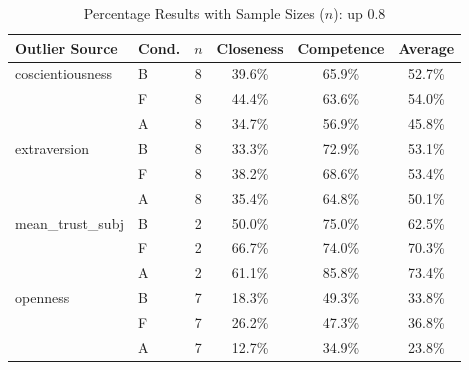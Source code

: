 \begin{table}[ht]
    \centering
    \caption{Percentage Results with Sample Sizes ($n$): up 0.8}
    \begin{tabular}{l l c c c c}
        \toprule
        \textbf{Outlier Source} & \textbf{Cond.} & \textbf{$n$} & \textbf{Closeness} & \textbf{Competence} & \textbf{Average} \\
        \midrule
        coscientiousness & B & 8 & 39.6\% & 65.9\% & 52.7\% \\
         & F & 8 & 44.4\% & 63.6\% & 54.0\% \\
         & A & 8 & 34.7\% & 56.9\% & 45.8\% \\
        \addlinespace
        extraversion & B & 8 & 33.3\% & 72.9\% & 53.1\% \\
         & F & 8 & 38.2\% & 68.6\% & 53.4\% \\
         & A & 8 & 35.4\% & 64.8\% & 50.1\% \\
        \addlinespace
        mean\_trust\_subj & B & 2 & 50.0\% & 75.0\% & 62.5\% \\
         & F & 2 & 66.7\% & 74.0\% & 70.3\% \\
         & A & 2 & 61.1\% & 85.8\% & 73.4\% \\
        \addlinespace
        openness & B & 7 & 18.3\% & 49.3\% & 33.8\% \\
         & F & 7 & 26.2\% & 47.3\% & 36.8\% \\
         & A & 7 & 12.7\% & 34.9\% & 23.8\% \\
        \bottomrule
    \end{tabular}
\end{table}
